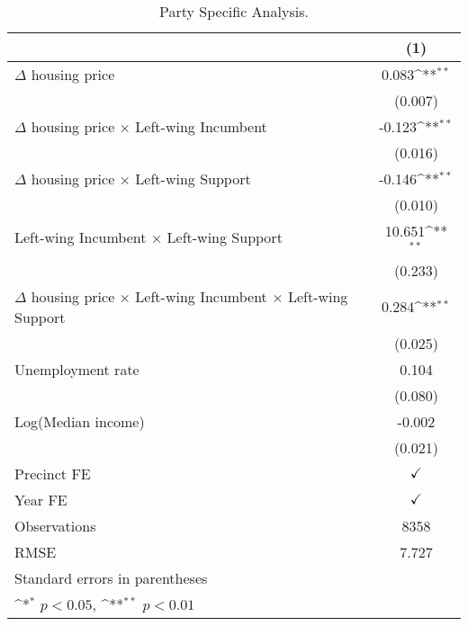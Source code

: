 \begin{table}[htbp]\centering
\def\sym#1{\ifmmode^{#1}\else\(^{#1}\)\fi}
\caption{Party Specific Analysis.} \label{partyspecifictab}
\begin{tabular}{l*{1}{c}}
\hline\hline
                    &\multicolumn{1}{c}{(1)}        \\
\hline
$\Delta$ housing price&       0.083\sym{**}\\
                    &     (0.007)        \\
[1em]
$\Delta$ housing price $\times$ Left-wing Incumbent&      -0.123\sym{**}\\
                    &     (0.016)        \\
[1em]
$\Delta$ housing price $\times$ Left-wing Support&      -0.146\sym{**}\\
                    &     (0.010)        \\
[1em]
Left-wing Incumbent $\times$ Left-wing Support&      10.651\sym{**}\\
                    &     (0.233)        \\
[1em]
$\Delta$ housing price $\times$ Left-wing Incumbent $\times$ Left-wing Support&       0.284\sym{**}\\
                    &     (0.025)        \\
[1em]
Unemployment rate   &       0.104        \\
                    &     (0.080)        \\
[1em]
Log(Median income)  &      -0.002        \\
                    &     (0.021)        \\
[1em]
\hline Precinct FE  &$\checkmark$        \\
[1em]
Year FE             &$\checkmark$        \\
\hline
Observations        &        8358        \\
RMSE                &       7.727        \\
\hline\hline
\multicolumn{2}{l}{\footnotesize Standard errors in parentheses}\\
\multicolumn{2}{l}{\footnotesize \sym{*} \(p<0.05\), \sym{**} \(p<0.01\)}\\
\end{tabular}
\end{table}
